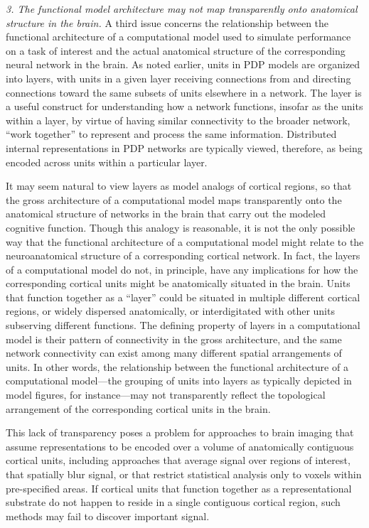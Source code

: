 {\em 3. The functional model architecture may not map transparently onto anatomical structure in the brain.} A third issue concerns the relationship between the functional architecture of a computational model used to simulate performance on a task of interest and the actual anatomical structure of the corresponding neural network in the brain.  As noted earlier, units in PDP models are organized into layers, with units in a given layer receiving connections from and directing connections toward the same subsets of units elsewhere in a network. The layer is a useful construct for understanding how a network functions, insofar as the units within a layer, by virtue of having similar connectivity to the broader network, ``work together'' to represent and process the same information. Distributed internal representations in PDP networks are typically viewed, therefore, as being encoded across units within a particular layer.  

It may seem natural to view layers as model analogs of cortical regions, so that the gross architecture of a computational model maps transparently onto the anatomical structure of networks in the brain that carry out the modeled cognitive function. Though this analogy is reasonable, it is not the only possible way that the functional architecture of a computational model might relate to the neuroanatomical structure of a corresponding cortical network. In fact, the layers of a computational model do not, in principle, have any implications for how the corresponding cortical units might be anatomically situated in the brain. Units that function together as a ``layer'' could be situated in multiple different cortical regions, or widely dispersed anatomically, or interdigitated with other units subserving different functions. The defining property of layers in a computational model is their pattern of connectivity in the gross architecture, and the same network connectivity can exist among many different spatial arrangements of units. In other words, the relationship between the functional architecture of a computational model---the grouping of units into layers as typically depicted in model figures, for instance---may not transparently reflect the topological arrangement of the corresponding cortical units in the brain. 

This lack of transparency poses a problem for approaches to brain imaging that assume representations to be encoded over a volume of anatomically contiguous cortical units, including approaches that average signal over regions of interest, that spatially blur signal, or that restrict statistical analysis only to voxels within pre-specified areas. If cortical units that function together as a representational substrate do not happen to reside in a single contiguous cortical region, such methods may fail to discover important signal.

